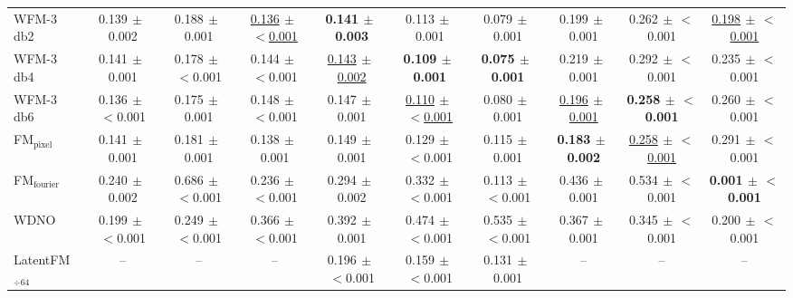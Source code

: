 \begin{table}[ht]
{\begin{tabular}{l ccc ccc ccc}
WFM-3 db2 & 0.139{\scriptsize$\,\pm\,$0.002} & 0.188{\scriptsize$\,\pm\,$0.001} & \underline{0.136{\scriptsize$\,\pm\,$$<$0.001}} & \textbf{0.141{\scriptsize$\,\pm\,$0.003}} & 0.113{\scriptsize$\,\pm\,$0.001} & 0.079{\scriptsize$\,\pm\,$0.001} & 0.199{\scriptsize$\,\pm\,$0.001} & 0.262{\scriptsize$\,\pm\,$$<$0.001} & \underline{0.198{\scriptsize$\,\pm\,$$<$0.001}} \\
WFM-3 db4 & 0.141{\scriptsize$\,\pm\,$0.001} & 0.178{\scriptsize$\,\pm\,$$<$0.001} & 0.144{\scriptsize$\,\pm\,$$<$0.001} & \underline{0.143{\scriptsize$\,\pm\,$0.002}} & \textbf{0.109{\scriptsize$\,\pm\,$0.001}} & \textbf{0.075{\scriptsize$\,\pm\,$0.001}} & 0.219{\scriptsize$\,\pm\,$0.001} & 0.292{\scriptsize$\,\pm\,$$<$0.001} & 0.235{\scriptsize$\,\pm\,$$<$0.001} \\
WFM-3 db6 & 0.136{\scriptsize$\,\pm\,$$<$0.001} & 0.175{\scriptsize$\,\pm\,$0.001} & 0.148{\scriptsize$\,\pm\,$$<$0.001} & 0.147{\scriptsize$\,\pm\,$0.001} & \underline{0.110{\scriptsize$\,\pm\,$$<$0.001}} & 0.080{\scriptsize$\,\pm\,$0.001} & \underline{0.196{\scriptsize$\,\pm\,$0.001}} & \textbf{0.258{\scriptsize$\,\pm\,$$<$0.001}} & 0.260{\scriptsize$\,\pm\,$$<$0.001} \\
\midrule
FM$_\text{pixel}$ & 0.141{\scriptsize$\,\pm\,$0.001} & 0.181{\scriptsize$\,\pm\,$0.001} & 0.138{\scriptsize$\,\pm\,$0.001} & 0.149{\scriptsize$\,\pm\,$0.001} & 0.129{\scriptsize$\,\pm\,$$<$0.001} & 0.115{\scriptsize$\,\pm\,$0.001} & \textbf{0.183{\scriptsize$\,\pm\,$0.002}} & \underline{0.258{\scriptsize$\,\pm\,$$<$0.001}} & 0.291{\scriptsize$\,\pm\,$$<$0.001} \\
FM$_\text{fourier}$ & 0.240{\scriptsize$\,\pm\,$0.002} & 0.686{\scriptsize$\,\pm\,$$<$0.001} & 0.236{\scriptsize$\,\pm\,$$<$0.001} & 0.294{\scriptsize$\,\pm\,$0.002} & 0.332{\scriptsize$\,\pm\,$$<$0.001} & 0.113{\scriptsize$\,\pm\,$$<$0.001} & 0.436{\scriptsize$\,\pm\,$0.001} & 0.534{\scriptsize$\,\pm\,$$<$0.001} & \textbf{0.001{\scriptsize$\,\pm\,$$<$0.001}} \\
WDNO & 0.199{\scriptsize$\,\pm\,$$<$0.001} & 0.249{\scriptsize$\,\pm\,$$<$0.001} & 0.366{\scriptsize$\,\pm\,$$<$0.001} & 0.392{\scriptsize$\,\pm\,$0.001} & 0.474{\scriptsize$\,\pm\,$$<$0.001} & 0.535{\scriptsize$\,\pm\,$$<$0.001} & 0.367{\scriptsize$\,\pm\,$0.001} & 0.345{\scriptsize$\,\pm\,$$<$0.001} & 0.200{\scriptsize$\,\pm\,$$<$0.001} \\
LatentFM$_{\div 64}$ & -- & -- & -- & 0.196{\scriptsize$\,\pm\,$$<$0.001} & 0.159{\scriptsize$\,\pm\,$$<$0.001} & 0.131{\scriptsize$\,\pm\,$0.001} & -- & -- & -- \\
\bottomrule
\end{tabular}
}
\end{table}
